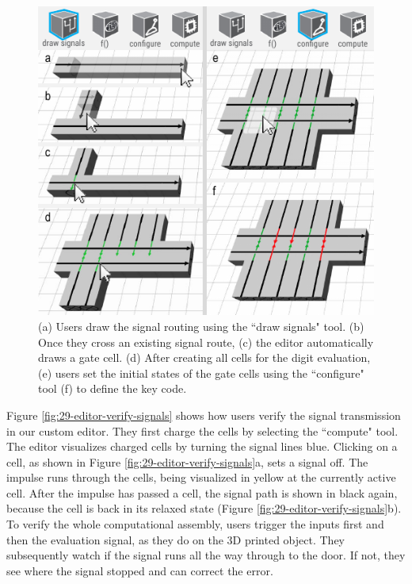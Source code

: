 \begin{figure} [h]
    \includegraphics[width=\textwidth]{chapters/digital-metamaterials-FIG/28-editor-draw-signals.pdf}
    \caption[Short figure name.]{(a) Users draw the signal routing using the ``draw signals" tool. (b) Once they cross an existing signal route, (c) the editor automatically draws a gate cell. (d) After creating all cells for the digit evaluation, (e) users set the initial states of the gate cells using the ``configure" tool (f) to define the key code.
    \label{fig:28-editor-draw-signals}}
\end{figure}

Figure \ref{fig:29-editor-verify-signals} shows how users verify the signal transmission in our custom editor. They first charge the cells by selecting the ``compute" tool. The editor visualizes charged cells by turning the signal lines blue. Clicking on a cell, as shown in Figure \ref{fig:29-editor-verify-signals}a, sets a signal off. The impulse runs through the cells, being visualized in yellow at the currently active cell. After the impulse has passed a cell, the signal path is shown in black again, because the cell is back in its relaxed state (Figure \ref{fig:29-editor-verify-signals}b). To verify the whole computational assembly, users trigger the inputs first and then the evaluation signal, as they do on the 3D printed object. They subsequently watch if the signal runs all the way through to the door. If not, they see where the signal stopped and can correct the error. 

